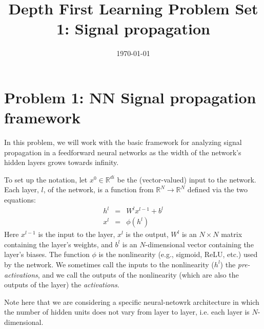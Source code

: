\documentclass[a4paper]{article}
\title{Depth First Learning Problem Set 1: Signal propagation}
\date{\today}
\begin{document}
\maketitle

\section*{Problem 1: NN Signal propagation framework}

In this problem, we will work with the basic framework for analyzing signal propagation in a feedforward neural networks as the width of the network's hidden layers grows towards infinity.  

To set up the notation, let $x^0 \in \mathbb{R}^{di}$ be the (vector-valued) input to the network.  Each layer, $l$, of the network, is a function from $\mathbb{R}^N \rightarrow \mathbb{R}^N$ defined via the two equations:
\begin{eqnarray}
h^l &=& W^l x^{l-1} + b^l \\
x^l &=& \phi(h^l)
\end{eqnarray}
Here $x^{l-1}$ is the input to the layer, $x^l$ is the output, $W^l$ is an $N\times N$ matrix containing the layer's weights, and $b^l$ is an $N$-dimensional vector containing the layer's biases.  The function $\phi$ is the nonlinearity (e.g., sigmoid, ReLU, etc.) used by the network.  We sometimes call the inputs to the nonlinearity ($h^l$) the \emph{pre-activations}, and we call the outputs of the nonlinearity (which are also the outputs of the layer) the \emph{activations}.

Note here that we are considering a specific neural-netowrk architecture in which the number of hidden units does not vary from layer to layer, i.e. each layer is $N$-dimensional.  
\end{document}
